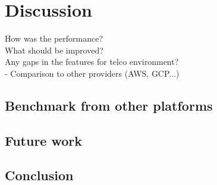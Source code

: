 \chapter{Discussion}
\label{chapter:discussion}

How was the performance? \\
What should be improved? \\
Any gaps in the features for telco environment? \\
- Comparison to other providers (AWS, GCP...) \\

\section{Benchmark from other platforms}

\section{Future work}

\section{Conclusion}
